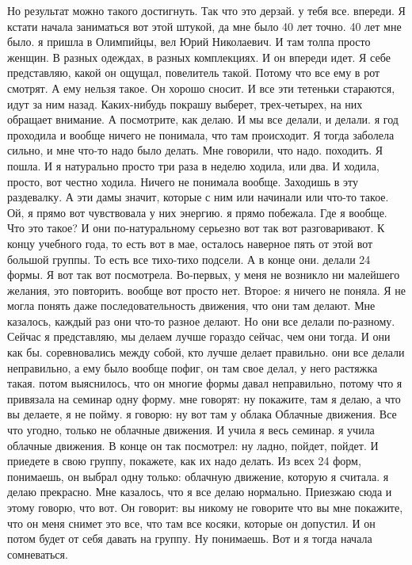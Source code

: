 Но результат можно такого достигнуть.
Так что это дерзай.
у тебя все.
впереди.
Я кстати начала заниматься вот этой штукой, да мне было 40 лет точно.
40 лет мне было. я пришла в Олимпийцы, вел Юрий Николаевич.
И там толпа просто женщин.
В разных одеждах, в разных комплекциях.
И он впереди идет.
Я себе представляю, какой он ощущал, повелитель такой.
Потому что все ему в рот смотрят.
А ему нельзя такое.
Он хорошо сносит.
И все эти тетеньки стараются, идут за ним назад.
Каких-нибудь покрашу выберет, трех-четырех, на них обращает внимание.
А посмотрите, как делаю.
И мы все делали, и делали. я год проходила и вообще ничего не понимала, что там происходит.
Я тогда заболела сильно, и мне что-то надо было делать.
Мне говорили, что надо.
походить.
Я пошла.
И я натурально просто три раза в неделю ходила, или два.
И ходила, просто, вот честно ходила.
Ничего не понимала вообще.
Заходишь в эту раздевалку.
А эти дамы значит, которые с ним или начинали или что-то такое.
Ой, я прямо вот чувствовала у них энергию. я прямо побежала.
Где я вообще.
Что это такое?
И они по-натуральному серьезно вот так вот разговаривают.
К концу учебного года, то есть вот в мае, осталось наверное пять от этой вот большой группы.
То есть все тихо-тихо подсели.
А в конце они.
делали 24 формы.
Я вот так вот посмотрела.
Во-первых, у меня не возникло ни малейшего желания, это повторить. вообще вот просто нет.
Второе: я ничего не поняла.
Я не могла понять даже последовательность движения, что они там делают.
Мне казалось, каждый раз они что-то разное делают.
Но они все делали по-разному.
Сейчас я представляю, мы делаем лучше гораздо сейчас, чем они тогда.
И они как бы.
соревновались между собой, кто лучше делает правильно. они все делали неправильно, а ему было вообще пофиг, он там свое делал, у него растяжка такая. потом выяснилось, что он многие формы давал неправильно, потому что я привязала на семинар одну форму.
мне говорят: ну покажите, там я делаю, а что вы делаете, я не пойму. я говорю: ну вот там у облака Облачные движения.
Все что угодно, только не облачные движения.
И учила я весь семинар. я учила облачные движения.
В конце он так посмотрел: ну ладно, пойдет, пойдет.
И приедете в свою группу, покажете, как их надо делать.
Из всех 24 форм, понимаешь, он выбрал одну только: облачную движение, которую я считала. я делаю прекрасно.
Мне казалось, что я все делаю нормально.
Приезжаю сюда и этому говорю, что вот.
Он говорит: вы никому не говорите что вы мне покажите, что он меня снимет это все, что там все косяки, которые он допустил.
И он потом будет от себя давать на группу.
Ну понимаешь.
Вот и я тогда начала сомневаться.
